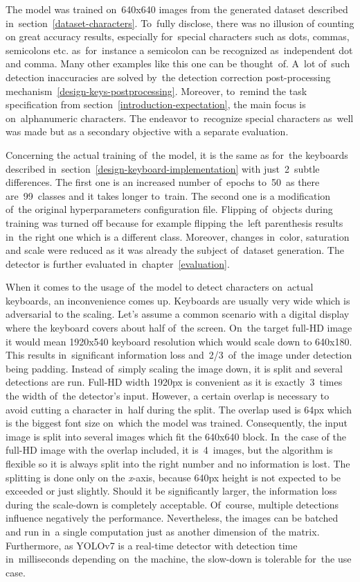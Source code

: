 The model was trained on~640x640 images from the generated dataset described in~section~\ref{dataset-characters}. To~fully disclose, there was no illusion of counting on great accuracy results, especially for~special characters such as dots, commas, semicolons etc. as~for~instance a semicolon can be recognized as~independent dot and comma. Many other examples like this one can be thought~of. A~lot of~such detection inaccuracies are solved by~the detection correction post-processing mechanism~\ref{design-keys-postprocessing}. Moreover, to~remind the task specification from section~\ref{introduction-expectation}, the main focus is on~alphanumeric characters. The endeavor to~recognize special characters as~well was made but as a secondary objective with a separate evaluation.

Concerning the actual training of~the model, it is the same as for~the keyboards described in~section~\ref{design-keyboard-implementation} with just~2~subtle differences. The first one is an increased number of~epochs to~50~as there are~99~classes and it takes longer to~train. The second one is a modification of~the original hyperparameters configuration file. Flipping of~objects during training was turned off because for example flipping the~left parenthesis results in~the right one which is a different class. Moreover, changes in~color, saturation and scale were reduced as it was already the subject of~dataset generation. The detector is further evaluated in~chapter~\ref{evaluation}.

When it comes to the usage of~the model to detect characters on~actual keyboards, an inconvenience comes up. Keyboards are usually very wide which is adversarial to the scaling. Let's assume a common scenario with a digital display where the keyboard covers about half of~the screen. On~the target full-HD image it would mean 1920x540 keyboard resolution which would scale down to 640x180. This results in~significant information loss and~2/3~of~the image under detection being padding. Instead of~simply scaling the image down, it is split and several detections are run. Full-HD width 1920px is convenient as it is exactly~3~times the width of~the detector's input. However, a certain overlap is necessary to avoid cutting a character in~half during the split. The overlap used is 64px which is the biggest font size on~which the model was trained. Consequently, the input image is split into several images which fit the 640x640 block. In~the case of the full-HD image with the overlap included, it is~4~images, but the algorithm is flexible so it is always split into the right number and no information is lost. The splitting is done only on the \emph{x}-axis, because 640px height is not expected to be exceeded or just slightly. Should it be significantly larger, the information loss during the scale-down is completely acceptable. Of~course, multiple detections influence negatively the performance. Nevertheless, the images can be batched and run in~a single computation just as another dimension of~the matrix. Furthermore, as YOLOv7 is a real-time detector with detection time in~milliseconds depending on~the machine, the slow-down is tolerable for~the use case.

